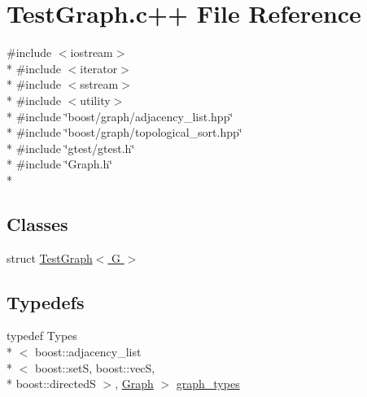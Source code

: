 \hypertarget{TestGraph_8c_09_09}{\section{Test\-Graph.\-c++ File Reference}
\label{TestGraph_8c_09_09}
}
{\ttfamily \#include $<$iostream$>$}\\*
{\ttfamily \#include $<$iterator$>$}\\*
{\ttfamily \#include $<$sstream$>$}\\*
{\ttfamily \#include $<$utility$>$}\\*
{\ttfamily \#include \char`\"{}boost/graph/adjacency\-\_\-list.\-hpp\char`\"{}}\\*
{\ttfamily \#include \char`\"{}boost/graph/topological\-\_\-sort.\-hpp\char`\"{}}\\*
{\ttfamily \#include \char`\"{}gtest/gtest.\-h\char`\"{}}\\*
{\ttfamily \#include \char`\"{}Graph.\-h\char`\"{}}\\*
\subsection*{Classes}
\begin{DoxyCompactItemize}
\item 
struct \hyperlink{structTestGraph}{Test\-Graph$<$ G $>$}
\end{DoxyCompactItemize}
\subsection*{Typedefs}
\begin{DoxyCompactItemize}
\item 
typedef Types\\*
$<$ boost\-::adjacency\-\_\-list\\*
$<$ boost\-::set\-S, boost\-::vec\-S, \\*
boost\-::directed\-S $>$, \hyperlink{classGraph}{Graph} $>$ \hyperlink{TestGraph_8c_09_09_ab8e2ae2a7026aca598606c55b1494184}{graph\-\_\-types}
\end{DoxyCompactItemize}
